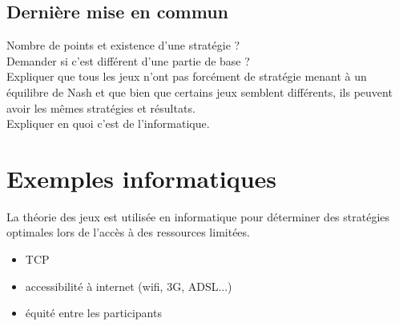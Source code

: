 \documentclass{article}
\begin{document}
\subsection{Dernière mise en commun}
Nombre de points et existence d'une stratégie ? \\
Demander si c'est différent d'une partie de base ? \\
Expliquer que tous les jeux n'ont pas forcément de stratégie menant à un équilibre de Nash et que bien que certains jeux semblent différents, ils peuvent avoir les mêmes stratégies et résultats.\\
Expliquer en quoi c'est de l'informatique.

\section{Exemples informatiques}
La théorie des jeux est utilisée en informatique pour déterminer des stratégies optimales lors de l'accès à des ressources limitées.
\begin{itemize}
    \item TCP
    \item accessibilité à internet (wifi, 3G, ADSL...)
    \item équité entre les participants
\end{itemize}
\end{document}
